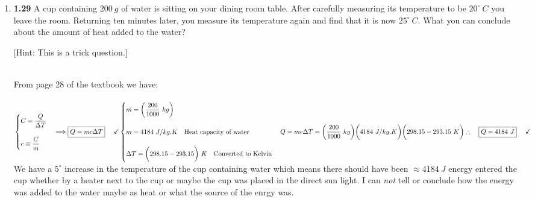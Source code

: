 \documentclass[fleqn]{article}
\begin{document}
  \begin{enumerate}
    \item \textbf{1.29} A cup containing $200 ~ g$ of water is sitting on your dining room table. After carefully measuring its 
    temperature to be $20^{\circ} ~ C$ you leave the room. Returning ten minutes later, you measure its temperature again 
    and find that it is now $25^{\circ} ~ C$. What you can conclude about the amount of heat added to the water?

    [Hint: This is a trick question.]

      \textcolor{hwColor}{
        \\
        From page 28 of the textbook we have:
        \\
        \\
        $
          \begin{cases}
            C=\dfrac{Q}{\Delta T}
            \\
            \\
            c \equiv \dfrac{C}{m}
          \end{cases} \Longrightarrow \boxed{Q=mc \Delta T} ~~~~ \checkmark
          \\
          \\
          \\
          \begin{cases}
            m=\bigg( \dfrac{200}{1000} ~ kg \bigg)
            \\
            \\
            m=4184 ~ J/kg.K ~~~ \text{Heat capacity of water}
            \\
            \\
            \Delta T= \bigg( 298.15 - 293.15 \bigg) ~ K ~~~ \text{Converted to Kelvin}
          \end{cases}
          \\
          \\
          \\
          Q=mc \Delta T=\bigg( \dfrac{200}{1000} ~ kg \bigg) \bigg( 4184 ~ J/kg.K \bigg) \bigg( 298.15 - 293.15 ~ K\bigg)
          \\
          \\
          \\
          \therefore ~~~ \boxed{
            Q=4184 ~ J
          } ~~~~ \checkmark
          \\
          \\
        $
        We have a $5^{\circ}$ increase in the temperature of the cup containing water which means there should have been
        $\approx 4184 ~ J$ energy entered the cup whether by a heater next to the cup or maybe the cup was placed in 
        the direct sun light. I can \emph{not} tell or conclude how the energy was added to the water maybe as heat or what 
        the source of the enrgy was.
        \\ 
      }


\end{enumerate}
\end{document}
